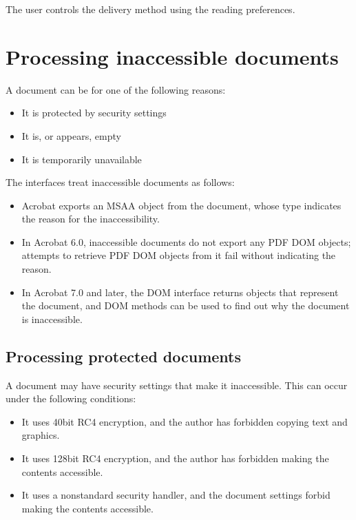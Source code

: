 \documentclass[letterpaper,12pt,english,openany,oneside]{sphinxmanual}
\begin{document}
The user controls the delivery method using the reading preferences.


\section{Processing inaccessible documents}
\label{\detokenize{index:processing-inaccessible-documents}}
A document can be  for one of the following reasons:
\begin{itemize}
\item {} 
It is protected by security settings

\item {} 
It is, or appears, empty

\item {} 
It is temporarily unavailable

\end{itemize}

The interfaces treat inaccessible documents as follows:
\begin{itemize}
\item {} 
Acrobat exports an MSAA object from the document, whose type indicates the reason for the inaccessibility.

\item {} 
In Acrobat 6.0, inaccessible documents do not export any PDF DOM objects; attempts to retrieve PDF DOM objects from it fail without indicating the reason.

\item {} 
In Acrobat 7.0 and later, the DOM interface returns objects that represent the document, and DOM methods can be used to find out why the document is inaccessible.

\end{itemize}




\subsection{Processing protected documents}
\label{\detokenize{index:processing-protected-documents}}
A document may have security settings that make it inaccessible. This can occur under the following conditions:
\begin{itemize}
\item {} 
It uses 40\sphinxhyphen{}bit RC4 encryption, and the author has forbidden copying text and graphics.

\item {} 
It uses 128\sphinxhyphen{}bit RC4 encryption, and the author has forbidden making the contents accessible.

\item {} 
It uses a non\sphinxhyphen{}standard security handler, and the document settings forbid making the contents accessible.

\end{itemize}
\end{document}
